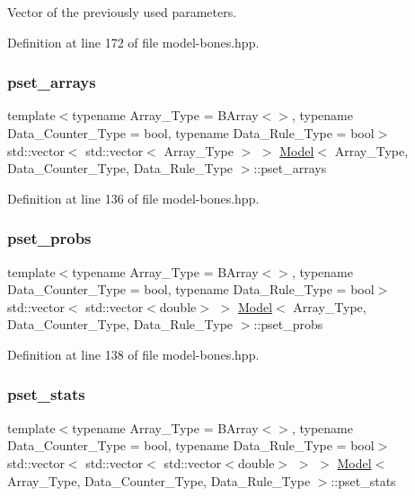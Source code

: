 Vector of the previously used parameters. 



Definition at line 172 of file model-\/bones.\+hpp.

\mbox{\label{class_model_a875ac0dbc320797c843b6724b7736f77}} 
\subsubsection{\texorpdfstring{pset\+\_\+arrays}{pset\_arrays}}
{\footnotesize\ttfamily template$<$typename Array\+\_\+\+Type = B\+Array$<$$>$, typename Data\+\_\+\+Counter\+\_\+\+Type = bool, typename Data\+\_\+\+Rule\+\_\+\+Type = bool$>$ \\
std\+::vector$<$ std\+::vector$<$ Array\+\_\+\+Type $>$ $>$ \hyperlink{class_model}{Model}$<$ Array\+\_\+\+Type, Data\+\_\+\+Counter\+\_\+\+Type, Data\+\_\+\+Rule\+\_\+\+Type $>$\+::pset\+\_\+arrays}



Definition at line 136 of file model-\/bones.\+hpp.

\mbox{\label{class_model_a5dea24375889e55064f052fd8e8c4fe2}} 
\subsubsection{\texorpdfstring{pset\+\_\+probs}{pset\_probs}}
{\footnotesize\ttfamily template$<$typename Array\+\_\+\+Type = B\+Array$<$$>$, typename Data\+\_\+\+Counter\+\_\+\+Type = bool, typename Data\+\_\+\+Rule\+\_\+\+Type = bool$>$ \\
std\+::vector$<$ std\+::vector$<$double$>$ $>$ \hyperlink{class_model}{Model}$<$ Array\+\_\+\+Type, Data\+\_\+\+Counter\+\_\+\+Type, Data\+\_\+\+Rule\+\_\+\+Type $>$\+::pset\+\_\+probs}



Definition at line 138 of file model-\/bones.\+hpp.

\mbox{\label{class_model_a89fff457ecccc91a624e20cafbf3e765}} 
\subsubsection{\texorpdfstring{pset\+\_\+stats}{pset\_stats}}
{\footnotesize\ttfamily template$<$typename Array\+\_\+\+Type = B\+Array$<$$>$, typename Data\+\_\+\+Counter\+\_\+\+Type = bool, typename Data\+\_\+\+Rule\+\_\+\+Type = bool$>$ \\
std\+::vector$<$ std\+::vector$<$ std\+::vector$<$double$>$ $>$ $>$ \hyperlink{class_model}{Model}$<$ Array\+\_\+\+Type, Data\+\_\+\+Counter\+\_\+\+Type, Data\+\_\+\+Rule\+\_\+\+Type $>$\+::pset\+\_\+stats}



